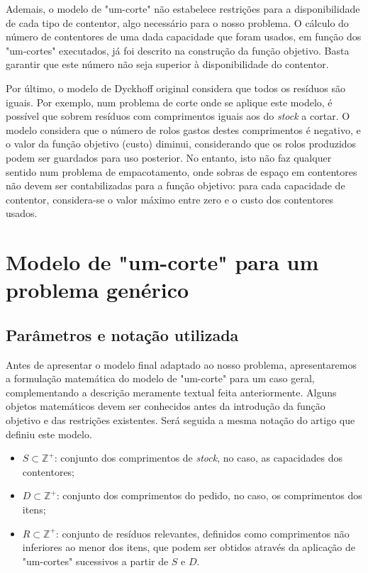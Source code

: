 \documentclass[12pt, a4paper, titlepage]{article}
\begin{document}
Ademais, o modelo de "um-corte"{} não estabelece restrições para a disponibilidade de cada tipo de
contentor, algo necessário para o nosso problema. O cálculo do número de contentores de uma dada
capacidade que foram usados, em função dos "um-cortes"{} executados, já foi descrito na construção
da função objetivo. Basta garantir que este número não seja superior à disponibilidade do contentor.

Por último, o modelo de Dyckhoff original considera que todos os resíduos são iguais. Por exemplo,
num problema de corte onde se aplique este modelo, é possível que sobrem resíduos com comprimentos
iguais aos do \emph{stock} a cortar. O modelo considera que o número de rolos gastos destes
comprimentos é negativo, e o valor da função objetivo (custo) diminui, considerando que os rolos
produzidos podem ser guardados para uso posterior. No entanto, isto não faz qualquer sentido num
problema de empacotamento, onde sobras de espaço em contentores não devem ser contabilizadas para a
função objetivo: para cada capacidade de contentor, considera-se o valor máximo entre zero e o custo
dos contentores usados.

\section{Modelo de "um-corte"{} para um problema genérico}

\subsection{Parâmetros e notação utilizada}

Antes de apresentar o modelo final adaptado ao nosso problema, apresentaremos a formulação
matemática do modelo de "um-corte"{} para um caso geral, complementando a descrição meramente
textual feita anteriormente. Alguns objetos matemáticos devem ser conhecidos antes da introdução da
função objetivo e das restrições existentes. Será seguida a mesma notação do artigo que definiu este
modelo. \cite{dyckhoff}

\begin{itemize}
    \item $S \subset \mathbb{\mathbb{Z}^+}$: conjunto dos comprimentos de \emph{stock}, no caso,
        as capacidades dos contentores;
    \item $D \subset \mathbb{\mathbb{Z}^+}$: conjunto dos comprimentos do pedido, no caso, os
        comprimentos dos
        itens;
    \item $R \subset \mathbb{\mathbb{Z}^+}$: conjunto de resíduos relevantes, definidos como
        comprimentos não inferiores ao menor dos itens, que podem ser obtidos através da aplicação
        de "um-cortes"{} sucessivos a partir de $S$ e $D$.
\end{itemize}
\end{document}
